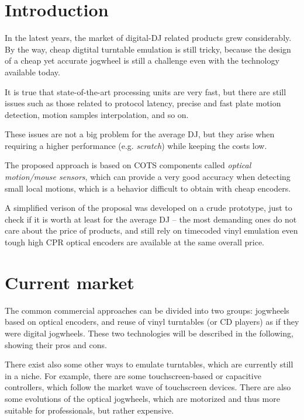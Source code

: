 \documentclass[a4paper,10pt]{article}
\begin{document}
\vspace{4ex}	%
\begin{multicols}{2}


\section{Introduction}
\label{sec:introduction}

In the latest years, the market of digital-DJ related products grew considerably.
By the way, cheap digtital turntable emulation is still tricky, because the
design of a cheap yet accurate jogwheel is still a challenge even with the
technology available today.

It is true that state-of-the-art processing units are very fast, but there are
still issues such as those related to protocol latency, precise and fast plate
motion detection, motion samples interpolation, and so on.

These issues are not a big problem for the average DJ, but they arise when
requiring a higher performance (e.g. \emph{scratch}) while keeping the costs
low.

The proposed approach is based on COTS components called \emph{optical motion/mouse
sensors}, which can provide a very good accuracy when detecting small local
motions, which is a behavior difficult to obtain with cheap encoders.

A simplified verison of the proposal was developed on a crude prototype, just
to check if it is worth at least for the average DJ -- the most demanding ones
do not care about the price of products, and still rely on timecoded vinyl
emulation even tough high CPR optical encoders are available at the same
overall price.


\section{Current market}
\label{sec:current_market}

The common commercial approaches can be divided into two groups: jogwheels
based on optical encoders, and reuse of vinyl turntables (or CD players) as if
they were digital jogwheels. These two technologies will be described in the
following, showing their pros and cons.

There exist also some other ways to emulate turntables, which are currently
still in a niche. For example, there are some touchscreen-based \cite{sm_emulator}
\cite{hn_touchosc} or capacitive \cite{stanton_scs3d} controllers, which
follow the market wave of touchscreen devices.
There are also some evolutions of the optical jogwheels, which are motorized
\cite{denon_sc3900} \cite{numark_v7} and thus more suitable for professionals,
but rather expensive.



\end{multicols}
\end{document}
